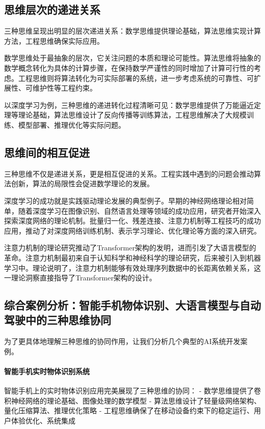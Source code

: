 \subsection{思维层次的递进关系}

三种思维呈现出明显的层次递进关系：数学思维提供理论基础，算法思维实现计算方法，工程思维确保实际应用。

数学思维处于最抽象的层次，它关注问题的本质和理论可能性。算法思维将抽象的数学概念转化为具体的计算步骤，在保持数学严谨性的同时增加了计算可行性的考虑。工程思维则将算法转化为可实际部署的系统，进一步考虑系统的可靠性、可扩展性、可维护性等工程约束。

以深度学习为例，三种思维的递进转化过程清晰可见：数学思维提供了万能逼近定理等理论基础，算法思维设计了反向传播等训练算法，工程思维解决了大规模训练、模型部署、推理优化等实际问题。

\subsection{思维间的相互促进}

三种思维不仅是递进关系，更是相互促进的关系。工程实践中遇到的问题会推动算法创新，算法的局限性会促进数学理论的发展。

深度学习的成功就是实践驱动理论发展的典型例子。早期的神经网络理论相对简单，随着深度学习在图像识别、自然语言处理等领域的成功应用，研究者开始深入探索深度网络的理论机制。批量归一化、残差连接、注意力机制等工程技巧的成功应用，推动了对深度网络训练机制、表示学习理论、优化理论等方面的深入研究。

注意力机制的理论研究推动了Transformer架构的发明，进而引发了大语言模型的革命。注意力机制最初来自于认知科学和神经科学的理论研究，后来被引入到机器学习中。理论说明了，注意力机制能够有效处理序列数据中的长距离依赖关系，这一理论洞察直接指导了Transformer架构的设计。

\subsection{综合案例分析：智能手机物体识别、大语言模型与自动驾驶中的三种思维协同}

为了更具体地理解三种思维的协同作用，让我们分析几个典型的AI系统开发案例。

\paragraph{智能手机实时物体识别系统}
智能手机上的实时物体识别应用完美展现了三种思维的协同：
- 数学思维提供了卷积神经网络的理论基础、图像处理的数学模型
- 算法思维设计了轻量级网络架构、量化压缩算法、推理优化策略
- 工程思维确保了在移动设备约束下的稳定运行、用户体验优化、系统集成

